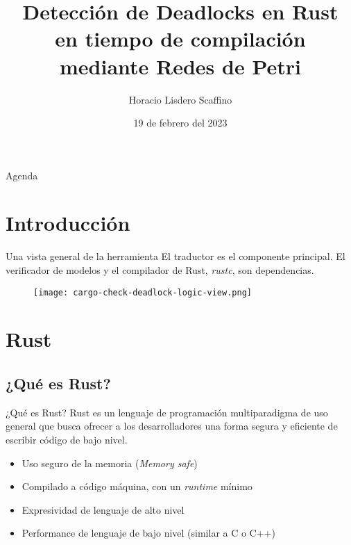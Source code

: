 \documentclass{beamer}
\title[Detección de Deadlocks en Rust]{Detección de Deadlocks en Rust \\ en tiempo de compilación \\ mediante Redes de Petri}
\author{Horacio Lisdero Scaffino}
\institute[FIUBA]{Facultad de Ingeniería\\Universidad de Buenos Aires}
\date{19 de febrero del 2023}
\begin{document}
\begin{frame}
  \titlepage
\end{frame}

\logo{}

\begin{frame}{Agenda}
  \tableofcontents
\end{frame}

\section{Introducción}

\begin{frame}{Una vista general de la herramienta}
  El traductor es el componente principal.
  El verificador de modelos y el compilador de Rust, \emph{rustc}, son dependencias.

  \begin{figure}
    \centering
    \texttt{[image: cargo-check-deadlock-logic-view.png]}
  \end{figure}
\end{frame}

\section{Rust}

\subsection{¿Qué es Rust?}

\begin{frame}{¿Qué es Rust?}
  Rust es un lenguaje de programación multiparadigma de uso general que
  busca ofrecer a los desarrolladores una forma segura y eficiente de escribir código de bajo nivel.
  
  \pause
  \vfill

  \begin{itemize}
    \item Uso seguro de la memoria (\emph{Memory safe})
    \item Compilado a código máquina, con un \emph{runtime} mínimo
    \item Expresividad de lenguaje de alto nivel
    \item Performance de lenguaje de bajo nivel (similar a C o C++)
  \end{itemize}
\end{frame}
\end{document}
